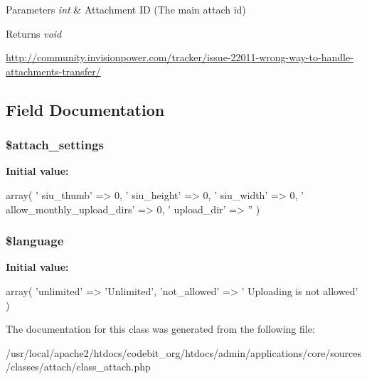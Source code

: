 \begin{DoxyParams}{Parameters}
{\em int} & Attachment I\-D (The main attach id) \\
\hline
\end{DoxyParams}
\begin{DoxyReturn}{Returns}
{\itshape void} 
\end{DoxyReturn}
\hyperlink{}{http\-://community.\-invisionpower.\-com/tracker/issue-\/22011-\/wrong-\/way-\/to-\/handle-\/attachments-\/transfer/}

\subsection{Field Documentation}
\hypertarget{classclass__attach_ae924ff9c67c824157d12e0fb26149637}{
\subsubsection[{\$attach\-\_\-settings}]{\setlength{\rightskip}{0pt plus 5cm}\$attach\-\_\-settings}}\label{classclass__attach_ae924ff9c67c824157d12e0fb26149637}
{\bfseries Initial value\-:}
\begin{DoxyCode}
 array( 
                                                                        \textcolor{stringliteral}{'
      siu\_thumb'}                 => 0,
                                                                        \textcolor{stringliteral}{'
      siu\_height'}                => 0,
                                                                        \textcolor{stringliteral}{'
      siu\_width'}                 => 0,
                                                                        \textcolor{stringliteral}{'
      allow\_monthly\_upload\_dirs'} => 0,
                                                                        \textcolor{stringliteral}{'
      upload\_dir'}                => \textcolor{stringliteral}{''} 
                                                                )
\end{DoxyCode}
\hypertarget{classclass__attach_a83170d318260a5a2e2a79dccdd371b10}{
\subsubsection[{\$language}]{\setlength{\rightskip}{0pt plus 5cm}\$language}}\label{classclass__attach_a83170d318260a5a2e2a79dccdd371b10}
{\bfseries Initial value\-:}
\begin{DoxyCode}
 array( \textcolor{stringliteral}{'unlimited'}   => \textcolor{stringliteral}{'Unlimited'},
                                                          \textcolor{stringliteral}{'not\_allowed'} => \textcolor{stringliteral}{'
      Uploading is not allowed'} )
\end{DoxyCode}


The documentation for this class was generated from the following file\-:\begin{DoxyCompactItemize}
\item 
/usr/local/apache2/htdocs/codebit\-\_\-org/htdocs/admin/applications/core/sources/classes/attach/class\-\_\-attach.\-php\end{DoxyCompactItemize}
